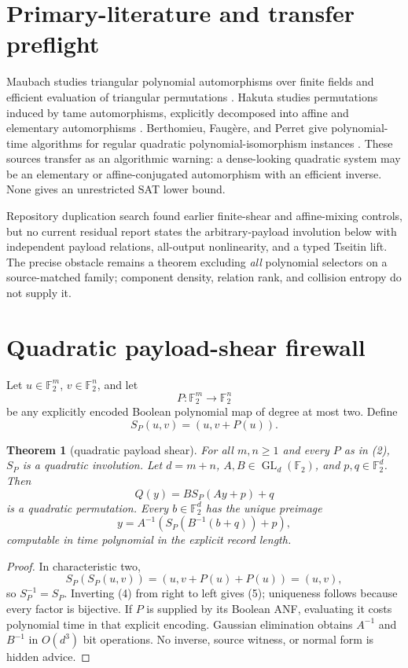 \documentclass[11pt]{article}
\newtheorem{theorem}{Theorem}
\newcommand{\F}{\mathbb F_2}
\begin{document}
\section{Primary-literature and transfer preflight}
Maubach studies triangular polynomial automorphisms over finite fields and
efficient evaluation of triangular permutations \cite{Maubach}.  Hakuta
studies permutations induced by tame automorphisms, explicitly decomposed
into affine and elementary automorphisms \cite{Hakuta}.  Berthomieu,
Faug\`ere, and Perret give polynomial-time algorithms for regular quadratic
polynomial-isomorphism instances \cite{BFP}.  These sources transfer as an
algorithmic warning: a dense-looking quadratic system may be an elementary
or affine-conjugated automorphism with an efficient inverse.  None gives an
unrestricted SAT lower bound.

Repository duplication search found earlier finite-shear and affine-mixing
controls, but no current residual report states the arbitrary-payload
involution below with independent payload relations, all-output nonlinearity,
and a typed Tseitin lift.  The precise obstacle remains a theorem excluding
\emph{all} polynomial selectors on a source-matched family; component density,
relation rank, and collision entropy do not supply it.

\section{Quadratic payload-shear firewall}
Let $u\in\F^m$, $v\in\F^n$, and let
\[
 P:\F^m\longrightarrow\F^n                              \tag{2}
\]
be any explicitly encoded Boolean polynomial map of degree at most two.
Define
\[
 S_P(u,v)=(u,v+P(u)).                                    \tag{3}
\]

\begin{theorem}[quadratic payload shear]
For all $m,n\ge1$ and every $P$ as in (2), $S_P$ is a quadratic involution.
Let $d=m+n$, $A,B\in\operatorname{GL}_d(\F)$, and $p,q\in\F^d$.  Then
\[
 Q(y)=B S_P(Ay+p)+q                                      \tag{4}
\]
is a quadratic permutation.  Every $b\in\F^d$ has the unique preimage
\[
 y=A^{-1}\left(S_P\!\left(B^{-1}(b+q)\right)+p\right),  \tag{5}
\]
computable in time polynomial in the explicit record length.
\end{theorem}
\begin{proof}
In characteristic two,
\[
 S_P(S_P(u,v))=(u,v+P(u)+P(u))=(u,v),                    \tag{6}
\]
so $S_P^{-1}=S_P$.  Inverting (4) from right to left gives (5); uniqueness
follows because every factor is bijective.  If $P$ is supplied by its Boolean
ANF, evaluating it costs polynomial time in that explicit encoding.  Gaussian
elimination obtains $A^{-1}$ and $B^{-1}$ in $O(d^3)$ bit operations.  No
inverse, source witness, or normal form is hidden advice.
\end{proof}
\end{document}
